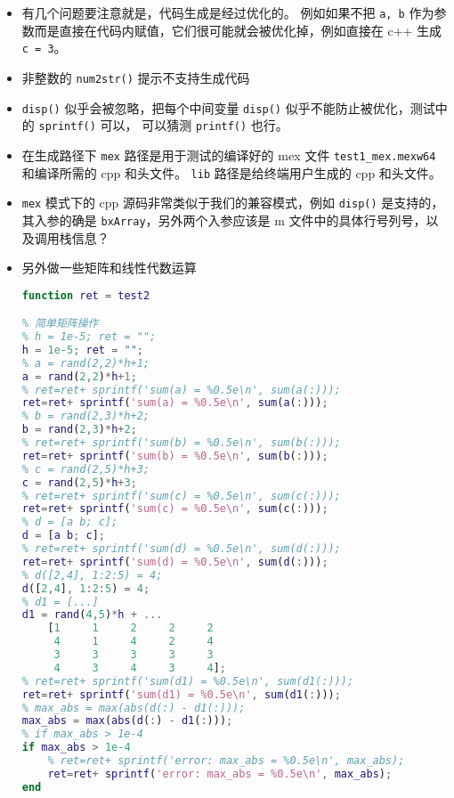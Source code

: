 \begin{itemize}
\begin{lstlisting}[language=matlab,caption=test1.m]
% 循环
% for n = 1:5
for n = 1:5
    % c = c + n;
    c = c + n;
end

% disp('c = '); ret = ret + 'c = ' + newline;
disp('c = '); ret = ret + 'c = ' + newline;
% disp(c); ret = ret + sprintf('%0.5e',c) + newline;
disp(c); ret = ret + sprintf('%0.5e',c) + newline;

% 子函数调用
% e = f1(a, b);
e = f1(a, b);

% disp('e = '); ret = ret + 'e = ' + newline;
disp('e = '); ret = ret + 'e = ' + newline;
% disp(e); ret = ret + sprintf('%0.5e',e) + newline;
disp(e); ret = ret + sprintf('%0.5e',e) + newline;

% 正常退出
end

% 子函数
function z = f1(x, y)
% z = x^2 + y^2;
z = x^2 + y^2;
end
\end{lstlisting}
\item 有几个问题要注意就是，代码生成是经过优化的。 例如如果不把 \verb`a, b` 作为参数而是直接在代码内赋值，它们很可能就会被优化掉，例如直接在 c++ 生成 \verb`c = 3`。
\item 非整数的 \verb`num2str()` 提示不支持生成代码
\item \verb`disp()` 似乎会被忽略，把每个中间变量 \verb`disp()` 似乎不能防止被优化，测试中的 \verb`sprintf()` 可以， 可以猜测 \verb`printf()` 也行。
\item 在生成路径下 \verb`mex` 路径是用于测试的编译好的 mex 文件 \verb`test1_mex.mexw64` 和编译所需的 cpp 和头文件。 \verb`lib` 路径是给终端用户生成的 cpp 和头文件。
\item \verb`mex` 模式下的 cpp 源码非常类似于我们的兼容模式，例如 \verb`disp()` 是支持的，其入参的确是 \verb`bxArray`，另外两个入参应该是 m 文件中的具体行号列号，以及调用栈信息？
\item 另外做一些矩阵和线性代数运算
\begin{lstlisting}[language=matlab]
function ret = test2

% 简单矩阵操作
% h = 1e-5; ret = "";
h = 1e-5; ret = "";
% a = rand(2,2)*h+1;
a = rand(2,2)*h+1;
% ret=ret+ sprintf('sum(a) = %0.5e\n', sum(a(:)));
ret=ret+ sprintf('sum(a) = %0.5e\n', sum(a(:)));
% b = rand(2,3)*h+2;
b = rand(2,3)*h+2;
% ret=ret+ sprintf('sum(b) = %0.5e\n', sum(b(:)));
ret=ret+ sprintf('sum(b) = %0.5e\n', sum(b(:)));
% c = rand(2,5)*h+3;
c = rand(2,5)*h+3;
% ret=ret+ sprintf('sum(c) = %0.5e\n', sum(c(:)));
ret=ret+ sprintf('sum(c) = %0.5e\n', sum(c(:)));
% d = [a b; c];
d = [a b; c];
% ret=ret+ sprintf('sum(d) = %0.5e\n', sum(d(:)));
ret=ret+ sprintf('sum(d) = %0.5e\n', sum(d(:)));
% d([2,4], 1:2:5) = 4;
d([2,4], 1:2:5) = 4;
% d1 = [...]
d1 = rand(4,5)*h + ...
    [1     1     2     2     2
     4     1     4     2     4
     3     3     3     3     3
     4     3     4     3     4];
% ret=ret+ sprintf('sum(d1) = %0.5e\n', sum(d1(:)));
ret=ret+ sprintf('sum(d1) = %0.5e\n', sum(d1(:)));
% max_abs = max(abs(d(:) - d1(:)));
max_abs = max(abs(d(:) - d1(:)));
% if max_abs > 1e-4
if max_abs > 1e-4
    % ret=ret+ sprintf('error: max_abs = %0.5e\n', max_abs);
    ret=ret+ sprintf('error: max_abs = %0.5e\n', max_abs);
end


\end{lstlisting}
\end{itemize}
